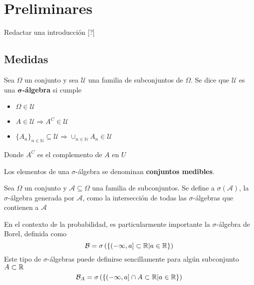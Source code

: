 
\chapter{Preliminares}

Redactar una introducción [?]


\section{Medidas}

\begin{definicion}%
Sea $\Omega$ un conjunto y sea $\mathcal{U}$ una familia de subconjuntos de $\Omega$. Se dice que 
$\mathcal{U}$ es una \textbf{$\boldsymbol{\sigma}$-álgebra} si cumple
\begin{itemize}
\item $\Omega \in \mathcal{U}$
\item $A \in \mathcal{U} \Rightarrow A^{C} \in \mathcal{U}$
\item 
$ \displaystyle \{ A_n \}_{n\in \mathbb{N}} \subseteq \mathcal{U} 
\Rightarrow \cup_{n\in \mathbb{N}} A_n \in \mathcal{U}$
\end{itemize}
Donde $A^{C}$ es el complemento de $A$ en $U$
\end{definicion}

Los elementos de una $\sigma$-álgebra se denominan \textbf{conjuntos medibles}. 

\begin{definicion}
Sea $\Omega$ un conjunto y $\mathcal{A} \subseteq \Omega$ una familia de subconjuntos. Se define a $\sigma(\mathcal{A})$, la $\sigma$-álgebra generada por $\mathcal{A}$, como la intersección de todas las $\sigma$-álgebras que contienen a $\mathcal{A}$  
\end{definicion}

En el contexto de la probabilidad, es particularmente importante la $\sigma$-álgebra de Borel, definida como
\begin{equation}
\mathcal{B} = \sigma\left( \left\{ \left( -\infty , a \right] \subset \mathbb{R} \lvert a\in \mathbb{R} \right\} \right)
\end{equation}
Este tipo de $\sigma$-álgebras puede definirse sencillamente para algún subconjunto $A \subset \mathbb{R}$
\begin{equation}
\mathcal{B}_A = \sigma\left( \left\{ \left( -\infty , a \right] \cap A \subset \mathbb{R} \lvert a\in \mathbb{R} \right\} \right)
\end{equation}


